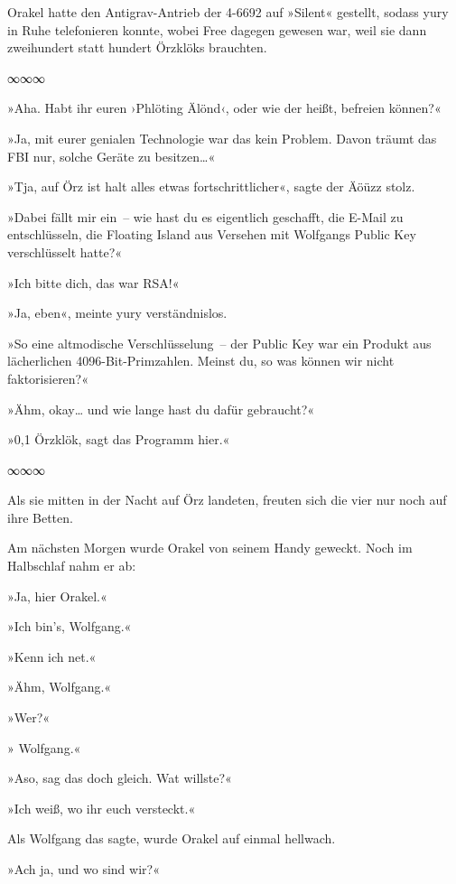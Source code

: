 Orakel hatte den Antigrav-Antrieb der 4-6692 auf »Silent« gestellt, sodass yury in Ruhe telefonieren konnte, wobei Free dagegen gewesen war, weil sie dann zweihundert statt hundert Örzklöks brauchten.

\begin{center}
    ∞∞∞
\end{center}

»Aha. Habt ihr euren ›Phlöting Älönd‹, oder wie der heißt, befreien können?«

»Ja, mit eurer genialen Technologie war das kein Problem. Davon träumt das FBI nur, solche Geräte zu besitzen…«

»Tja, auf Örz ist halt alles etwas fortschrittlicher«, sagte der Äöüzz stolz.

»Dabei fällt mir ein~– wie hast du es eigentlich geschafft, die E-Mail zu entschlüsseln, die Floating Island aus Versehen mit Wolfgangs Public Key verschlüsselt hatte?«

»Ich bitte dich, das war RSA!«

»Ja, eben«, meinte yury verständnislos.

»So eine altmodische Verschlüsselung~– der Public Key war ein Produkt aus lächerlichen 4096-Bit-Primzahlen. Meinst du, so was können wir nicht faktorisieren?«

»Ähm, okay… und wie lange hast du dafür gebraucht?«

»0,1 Örzklök, sagt das Programm hier.«

\begin{center}
    ∞∞∞
\end{center}

Als sie mitten in der Nacht auf Örz landeten, freuten sich die vier nur noch auf ihre Betten.

Am nächsten Morgen wurde Orakel von seinem Handy geweckt. Noch im Halbschlaf nahm er ab:

»Ja, hier Orakel.«

»Ich bin’s, Wolfgang.«

»Kenn ich net.«

»Ähm, Wolfgang.«

»Wer?«

» Wolfgang.«

»Aso, sag das doch gleich. Wat willste?«

»Ich weiß, wo ihr euch versteckt.«

Als Wolfgang das sagte, wurde Orakel auf einmal hellwach.

»Ach ja, und wo sind wir?«

